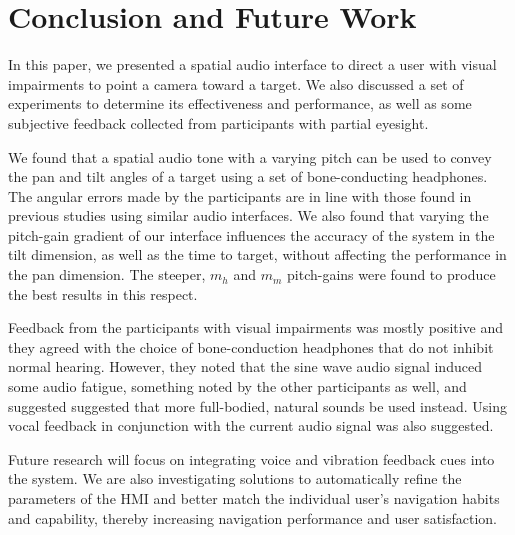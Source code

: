 \documentclass[sigconf, screen=true, anonymous=true]{acmart}
\begin{document}
\section{Conclusion and Future Work}\label{sec:conclusion}

In this paper, we presented a spatial audio interface to direct a user with visual impairments to point a camera toward a target. We also discussed a set of experiments to determine its effectiveness and performance, as well as some subjective feedback collected from participants with partial eyesight. 

We found that a spatial audio tone with a varying pitch can be used to convey the pan and tilt angles of a target using a set of bone-conducting headphones.
The angular errors made by the participants are in line with those found in previous studies using similar audio interfaces.
We also found that varying the pitch-gain gradient of our interface influences the accuracy of the system in the tilt dimension, as well as the time to target, without affecting the performance in the pan dimension.
The steeper, $m_h$ and $m_m$ pitch-gains were found to produce the best results in this respect.

Feedback from the participants with visual impairments was mostly positive and they agreed with the choice of bone-conduction headphones that do not inhibit normal hearing.
However, they noted that the sine wave audio signal induced some audio fatigue, something noted by the other participants as well, and suggested suggested that more full-bodied, natural sounds be used instead.
Using vocal feedback in conjunction with the current audio signal was also suggested. 

Future research will focus on integrating voice and vibration feedback cues into the system.
We are also investigating solutions to automatically refine the parameters of the HMI and better match the individual user's navigation habits and capability, thereby increasing navigation performance and user satisfaction.


%
\end{document}
